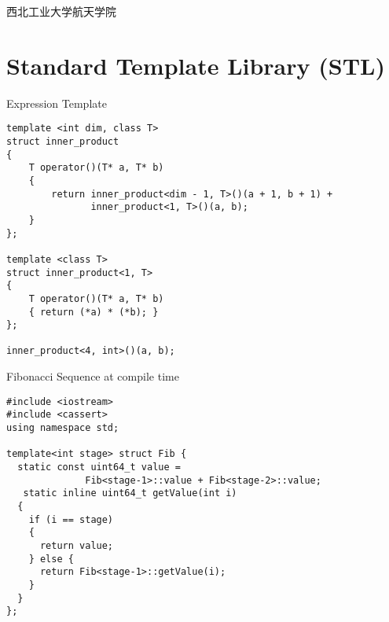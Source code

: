 

\def\lecturename{嵌入式技术}

\title{\insertlecture}

\author{邢超}

\institute
{
  西北工业大学航天学院
}


\subtitle{高阶编程}
\date{2013}



\begin{frame}
  \maketitle
\end{frame}


\section{Standard Template Library (STL)}
\begin{frame}[containsverbatim]{Expression Template}
\lstset{language=c++}
\begin{lstlisting}
template <int dim, class T>
struct inner_product
{
    T operator()(T* a, T* b)
    {
        return inner_product<dim - 1, T>()(a + 1, b + 1) +
               inner_product<1, T>()(a, b);
    }
};

template <class T>
struct inner_product<1, T>
{
    T operator()(T* a, T* b)
    { return (*a) * (*b); }
};

inner_product<4, int>()(a, b);

\end{lstlisting}
\end{frame}

\begin{frame}[containsverbatim]{Fibonacci Sequence at compile time}
\lstset{language=c++}
\begin{lstlisting}
#include <iostream>
#include <cassert>
using namespace std;
 
template<int stage> struct Fib {
  static const uint64_t value =
              Fib<stage-1>::value + Fib<stage-2>::value;
   static inline uint64_t getValue(int i)
  {
    if (i == stage) 
    {
      return value; 
    } else {
      return Fib<stage-1>::getValue(i); 
    }
  }
};
\end{lstlisting}
\end{frame}
 
